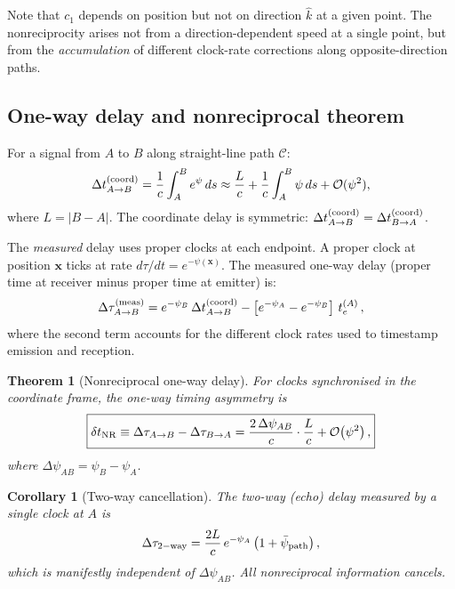 \documentclass[aps,prl,twocolumn,superscriptaddress,showpacs]{revtex4-2}
\newcommand{\Order}{\mathcal{O}}
\newtheorem{theorem}{Theorem}
\newtheorem{corollary}{Corollary}
\begin{document}
Note that $c_1$ depends on position but not on direction $\hat{k}$
at a given point.  The nonreciprocity arises not from a
direction-dependent speed at a single point, but from the
\emph{accumulation} of different clock-rate corrections along
opposite-direction paths.

\subsection{One-way delay and nonreciprocal theorem}

For a signal from $A$ to $B$ along straight-line path $\mathcal{C}$:
\begin{equation}
\Delta t_{A\to B}^{(\rm coord)} = \frac{1}{c}\int_A^B e^{\psi}\,ds
\approx \frac{L}{c} + \frac{1}{c}\int_A^B \psi\,ds + \Order(\psi^2),
\end{equation}
where $L = |B - A|$.  The coordinate delay is symmetric:
$\Delta t_{A\to B}^{(\rm coord)} = \Delta t_{B\to A}^{(\rm coord)}$.

The \emph{measured} delay uses proper clocks at each endpoint.
A proper clock at position $\mathbf{x}$ ticks at rate
$d\tau/dt = e^{-\psi(\mathbf{x})}$.  The measured one-way delay
(proper time at receiver minus proper time at emitter) is:
\begin{equation}
\Delta\tau_{A\to B}^{(\rm meas)} = e^{-\psi_B}\,\Delta t_{A\to B}^{(\rm coord)}
- \left[e^{-\psi_A} - e^{-\psi_B}\right]\,t_e^{(A)}\,,
\end{equation}
where the second term accounts for the different clock rates used
to timestamp emission and reception.

\begin{theorem}[Nonreciprocal one-way delay]
For clocks synchronised in the coordinate frame, the
one-way timing asymmetry is
\begin{equation}
\boxed{
\delta t_{\rm NR} \equiv \Delta\tau_{A\to B}
- \Delta\tau_{B\to A}
= \frac{2\,\Delta\psi_{AB}}{c}\cdot\frac{L}{c}
+ \Order\!\left(\psi^2\right),
}
\label{eq:NR_master}
\end{equation}
where $\Delta\psi_{AB} = \psi_B - \psi_A$.
\end{theorem}

\begin{corollary}[Two-way cancellation]
The two-way (echo) delay measured by a single clock at $A$ is
\begin{equation}
\Delta\tau_{\rm 2-way} = \frac{2L}{c}\,e^{-\psi_A}\left(1 + \bar\psi_{\rm path}\right),
\end{equation}
which is manifestly independent of $\Delta\psi_{AB}$.  All
nonreciprocal information cancels.
\end{corollary}
\end{document}
